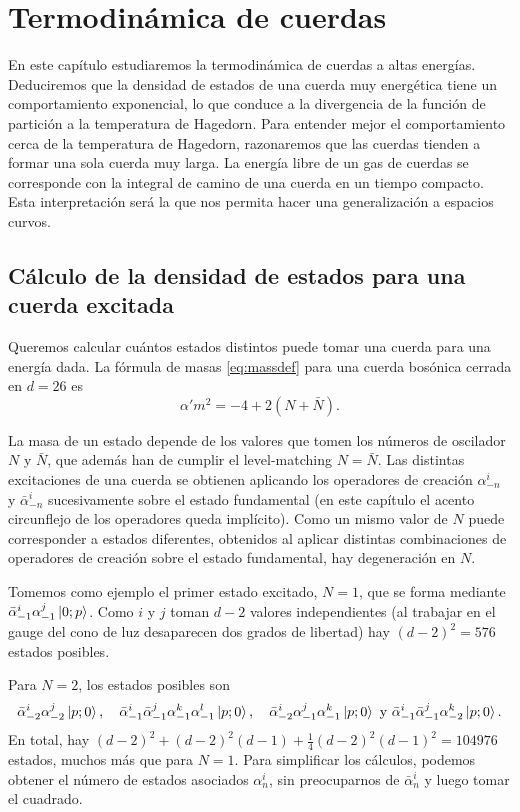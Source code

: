 \chapter{Termodinámica de cuerdas}

En este capítulo estudiaremos la termodinámica de cuerdas a altas energías.
Deduciremos que la densidad de estados de una cuerda muy energética tiene un comportamiento
exponencial, lo que conduce a la divergencia de la función de partición a la temperatura de 
Hagedorn.
Para entender mejor el comportamiento cerca de la temperatura de Hagedorn, razonaremos 
que las cuerdas tienden a formar una sola cuerda muy larga.
La energía libre de un gas de cuerdas se corresponde con la integral de camino de una cuerda
en un tiempo compacto.
Esta interpretación será la que nos permita hacer una generalización a espacios curvos.

\section{Cálculo de la densidad de estados para una cuerda excitada}

Queremos calcular cuántos estados distintos puede tomar una cuerda para una energía dada.
La fórmula de masas \ref{eq:massdef} para una cuerda bosónica cerrada en $d=26$ es 
\begin{equation}
  \alpha' m^2=-4+2(N+\bar N).
\end{equation}

La masa de un estado depende de los valores que tomen los números de oscilador $N$ y $\bar N$, que además
han de cumplir el level-matching $N=\bar N$.
Las distintas excitaciones de una cuerda se obtienen aplicando los operadores
de creación $\alpha^i_{-n}$ y $\bar \alpha^i_{-n}$ sucesivamente sobre el estado fundamental (en este
capítulo el acento circunflejo de los operadores queda implícito).
Como un mismo valor de $N$ puede corresponder a estados diferentes, obtenidos al aplicar distintas
combinaciones de operadores de creación sobre el estado fundamental, hay degeneración en $N$.

Tomemos como ejemplo el primer estado excitado, $N=1$, que se forma mediante $\bar \alpha^i_{-1} \alpha^j_{-1} \ket{0;p}$.
Como $i$ y $j$ toman $d-2$ valores independientes (al trabajar en el gauge del cono de luz desaparecen dos grados de libertad)
hay $(d-2)^2=576$ estados posibles.

Para $N=2$, los estados posibles son
\begin{equation*}
  \bar \alpha^i_{-2} \alpha^j_{-2}\ket{p;0},  \quad
  \bar \alpha^i_{-1} \bar \alpha^j_{-1} \alpha^k_{-1} \alpha^l_{-1} \ket{p;0}, \quad
  \bar \alpha^i_{-2} \alpha^j_{-1} \alpha^k_{-1}\ket{p;0} \text{ y } 
  \bar \alpha^i_{-1} \bar \alpha^j_{-1} \alpha^k_{-2} \ket{p;0}.
\end{equation*}
En total, hay $(d-2)^2 + (d-2)^2(d-1) + \frac{1}{4}(d-2)^2(d-1)^2= 104976$ estados, muchos más que para $N=1$.
Para simplificar los cálculos, podemos obtener el número de estados asociados $\alpha^i_n$,
sin preocuparnos de $\bar \alpha^i_n$ y luego tomar el cuadrado.

